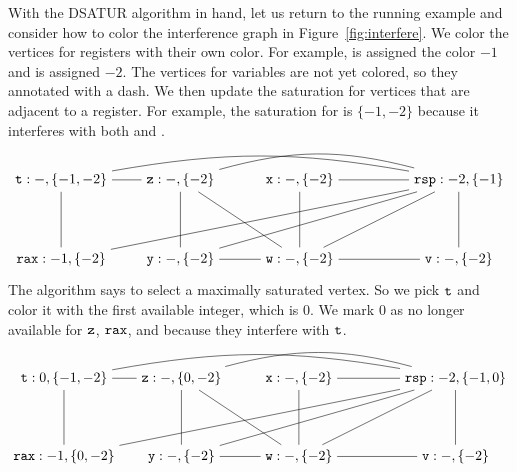 \documentclass[11pt]{book}
\begin{document}
With the DSATUR algorithm in hand, let us return to the running
example and consider how to color the interference graph in
Figure~\ref{fig:interfere}.
%
We color the vertices for registers with their own color. For example,
 is assigned the color $-1$ and  is assigned $-2$.
The vertices for variables are not yet colored, so they annotated with
a dash. We then update the saturation for vertices that are adjacent
to a register. For example, the saturation for  is $\{-1,-2\}$
because it interferes with both  and .
\[
\begin{tikzpicture}[baseline=(current  bounding  box.center)]
\node (rax) at (0,0) {$\ttm{rax}:-1,\{-2\}$};
\node (rsp) at (10,2) {$\ttm{rsp}:-2,\{-1\}$};
\node (t1) at (0,2) {$\ttm{t}:-,\{-1,-2\}$};
\node (z) at (3,2)  {$\ttm{z}:-,\{-2\}$};
\node (x) at (6,2)  {$\ttm{x}:-,\{-2\}$};
\node (y) at (3,0)  {$\ttm{y}:-,\{-2\}$};
\node (w) at (6,0)  {$\ttm{w}:-,\{-2\}$};
\node (v) at (10,0)  {$\ttm{v}:-,\{-2\}$};

\draw (t1) to (rax);
\draw (t1) to (z);
\draw (z) to (y);
\draw (z) to (w);
\draw (x) to (w);
\draw (y) to (w);
\draw (v) to (w);

\draw (v) to (rsp);
\draw (w) to (rsp);
\draw (x) to (rsp);
\draw (y) to (rsp);
\path[-.,bend left=15] (z) edge node {} (rsp);
\path[-.,bend left=10] (t1) edge node {} (rsp);
\draw (rax) to (rsp);
\end{tikzpicture}
\]
The algorithm says to select a maximally saturated vertex. So we pick
$\mathtt{t}$ and color it with the first available integer, which is
$0$. We mark $0$ as no longer available for $\mathtt{z}$, $\mathtt{rax}$,
and  because they interfere with $\mathtt{t}$.
\[
\begin{tikzpicture}[baseline=(current  bounding  box.center)]
\node (rax) at (0,0) {$\ttm{rax}:-1,\{0,-2\}$};
\node (rsp) at (10,2) {$\ttm{rsp}:-2,\{-1,0\}$};
\node (t1) at (0,2) {$\ttm{t}:0,\{-1,-2\}$};
\node (z) at (3,2)  {$\ttm{z}:-,\{0,-2\}$};
\node (x) at (6,2)  {$\ttm{x}:-,\{-2\}$};
\node (y) at (3,0)  {$\ttm{y}:-,\{-2\}$};
\node (w) at (6,0)  {$\ttm{w}:-,\{-2\}$};
\node (v) at (10,0)  {$\ttm{v}:-,\{-2\}$};

\draw (t1) to (rax);
\draw (t1) to (z);
\draw (z) to (y);
\draw (z) to (w);
\draw (x) to (w);
\draw (y) to (w);
\draw (v) to (w);

\draw (v) to (rsp);
\draw (w) to (rsp);
\draw (x) to (rsp);
\draw (y) to (rsp);
\path[-.,bend left=15] (z) edge node {} (rsp);
\path[-.,bend left=10] (t1) edge node {} (rsp);
\draw (rax) to (rsp);
\end{tikzpicture}
\]
\end{document}
